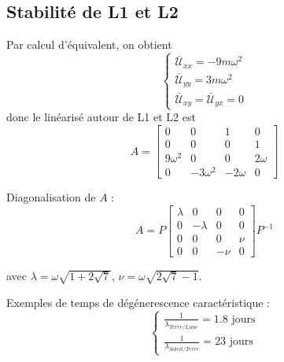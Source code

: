 \documentclass{beamer}
\begin{document}
	\subsection{Stabilité de L1 et L2}
	\begin{frame}
		Par calcul d'équivalent, on obtient
		\begin{equation*}
			\begin{cases}
				\bar{\mathcal{U}}_{xx} = -9m\omega^2
				\\
				\bar{\mathcal{U}}_{yy} = 3m\omega^2
				\\
				\bar{\mathcal{U}}_{xy} = \bar{\mathcal{U}}_{yx} = 0
			\end{cases}
		\end{equation*}
		donc le linéarisé autour de L1 et L2 est
		\begin{equation*}
			A =
			\begin{bmatrix}
				0 & 0 & 1 & 0 \\
				0 & 0 & 0 & 1 \\
				9\omega^2 & 0
				& 0 & 2\omega \\
				0 & -3\omega^2
				& -2\omega & 0
			\end{bmatrix}
		\end{equation*}
	\end{frame}
	
	\begin{frame}
		Diagonalisation de $A$ :
		\begin{equation*}
			\label{eq du mvt dz}
			A
			=
			P
			\begin{bmatrix}
				\lambda & 0 & 0 & 0
				\\
				0 & -\lambda & 0 & 0
				\\
				0 & 0 & 0 & \nu
				\\
				0 & 0 & -\nu & 0
			\end{bmatrix}
			P^{-1}
		\end{equation*}
		
		avec $\lambda = \omega\sqrt{1+2\sqrt{7}} \text{, }\nu = \omega\sqrt{2\sqrt{7}-1}$.
		
				
		Exemples de temps de dégénerescence caractéristique :
		\begin{equation*}
			\begin{cases}
				\frac{1}{\lambda_{Terre/Lune}} = 1.8 \text{ jours}
				\\
				\frac{1}{\lambda_{Soleil/Terre}} = 23 \text{ jours}
			\end{cases}
		\end{equation*}
	\end{frame}
	
\end{document}

